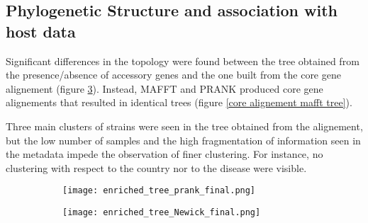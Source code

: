 \subsection*{Phylogenetic Structure and association with host data}
\graphicspath{{images/phylogeneticStructureHostData/}}



Significant differences in the topology were found between the tree obtained from the presence/absence of accessory genes
and the one built from the core gene alignement (figure \ref{fig:phylogenetic trees}). Instead,
MAFFT and PRANK produced core gene alignements that resulted in identical trees
(figure \ref{core alignement mafft tree}). 

Three main clusters of strains were seen in the tree obtained from the alignement, but the low number of samples and the high fragmentation of
information seen in the metadata impede the observation of finer clustering. 
For instance, no clustering with respect to the country nor to the disease were visible.


\begin{figure}[h!]
    \centering
    \begin{subfigure}[b]{0.7\textwidth}
        \centering
        \texttt{[image: enriched\_tree\_prank\_final.png]}
        \caption{}
        \label{fig:core alignment prank tree}
    \end{subfigure}
    \begin{subfigure}[b]{0.7\textwidth}
        \centering
        \texttt{[image: enriched\_tree\_Newick\_final.png]}
        \caption{}
        \label{fig:presence absence tree}
    \end{subfigure}
       \caption{}
       \label{fig:phylogenetic trees}
\end{figure}






